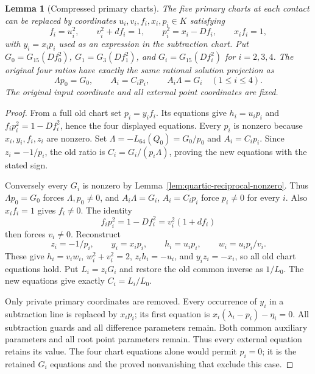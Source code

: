 \documentclass[11pt]{article}
\newtheorem{lemma}[theorem]{Lemma}
\theoremstyle{definition}
\theoremstyle{remark}
\begin{document}
\begin{lemma}[Compressed primary charts]
\label{lem:quartic-compressed-primary}
The five primary charts at each contact can be replaced by coordinates
$u_i,v_i,f_i,x_i,p_i\in K$ satisfying
\[
 f_i=u_i^2,\qquad v_i^2+df_i=1,\qquad
 p_i^2=x_i-Df_i,\qquad x_if_i=1,
\]
with $y_i=x_ip_i$ used as an expression in the subtraction chart.
Put $G_0=G_{15}(Df_0^2)$, $G_1=G_3(Df_1^2)$, and
$G_i=G_{15}(Df_i^2)$ for $i=2,3,4$. The original four ratios have
exactly the same rational solution projection as
\[
 \Lambda p_0=G_0,\qquad A_i=C_ip_i,\qquad A_i\Lambda=G_i
 \quad(1\le i\le4).
\]
The original input coordinate and all external point coordinates are fixed.
\end{lemma}
\begin{proof}
From a full old chart set $p_i=y_if_i$. Its equations give
$h_i=u_ip_i$ and $f_ip_i^2=1-Df_i^2$, hence the four displayed equations.
Every $p_i$ is nonzero because $x_i,y_i,f_i,z_i$ are nonzero.
Set $\Lambda=-L_{64}(Q_0)=G_0/p_0$ and $A_i=C_ip_i$.
Since $z_i=-1/p_i$, the old ratio is
$C_i=G_i/(p_i\Lambda)$, proving the new equations with the stated sign.

Conversely every $G_i$ is nonzero by
Lemma~\ref{lem:quartic-reciprocal-nonzero}. Thus $\Lambda p_0=G_0$
forces $\Lambda,p_0\ne0$, and $A_i\Lambda=G_i$, $A_i=C_ip_i$
force $p_i\ne0$ for every $i$. Also $x_if_i=1$ gives $f_i\ne0$.
The identity
\[
 f_ip_i^2=1-Df_i^2=v_i^2(1+df_i)
\]
then forces $v_i\ne0$. Reconstruct
\[
 z_i=-1/p_i,\qquad y_i=x_ip_i,\qquad
 h_i=u_ip_i,\qquad w_i=u_ip_i/v_i.
\]
These give $h_i=v_iw_i$, $w_i^2+v_i^2=2$, $z_ih_i=-u_i$,
and $y_iz_i=-x_i$, so all old chart equations hold. Put
$L_i=z_iG_i$ and restore the old common inverse as $1/L_0$.
The new equations give exactly $C_i=L_i/L_0$.

Only private primary coordinates are removed. Every occurrence of $y_i$
in a subtraction line is replaced by $x_ip_i$; its first equation is
$x_i(\lambda_i-p_i)-\eta_i=0$. All subtraction guards and all difference
parameters remain. Both common auxiliary parameters and all root point
parameters remain. Thus every external equation retains its value.
The four chart equations alone would permit $p_i=0$; it is the retained
$G_i$ equations and the proved nonvanishing that exclude this case.
\end{proof}
\end{document}
